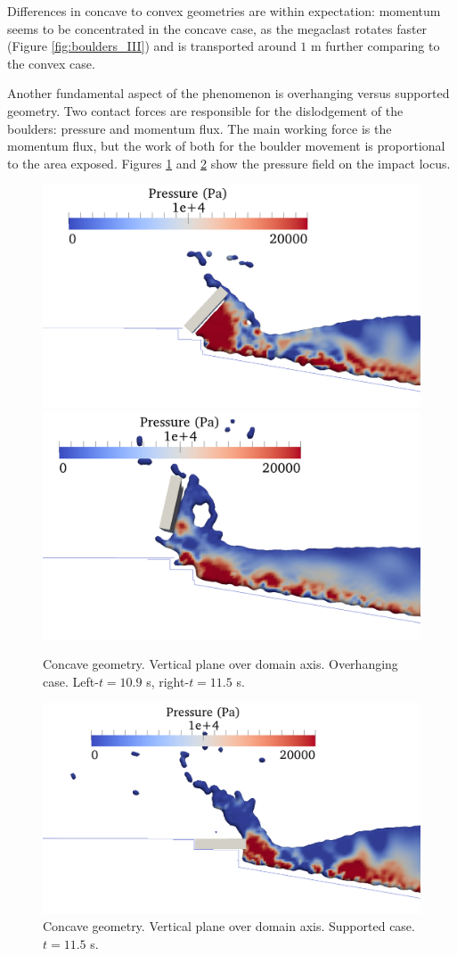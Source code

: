 Differences in concave to convex geometries are within expectation: momentum seems to be concentrated in the concave case, as the megaclast rotates faster (Figure \ref{fig:boulders_III}) and is transported around $1$ m further comparing to the convex case. 

Another fundamental aspect of the phenomenon is overhanging versus supported geometry. Two contact forces are responsible for the dislodgement of the boulders: pressure and momentum flux. The main working force is the momentum flux, but the work of both for the boulder movement is proportional to the area exposed. Figures \ref{fig:boulders_V} and \ref{fig:boulders_VI} show the pressure field on the impact locus. 

%
\begin{figure}[ht!]
	\centering
	\includegraphics[width=0.48\linewidth]{Figures/6.Chapter/2D_press_norm_I} 
	\includegraphics[width=0.48\linewidth]{Figures/6.Chapter/2D_press_norm_II}
	\caption{Concave geometry. Vertical plane over domain axis. Overhanging case. Left-$t=10.9$ s, right-$t=11.5$ s.}
	\label{fig:boulders_V} 
\end{figure}
%

%
\begin{figure}[ht!]
	\centering
	\includegraphics[width=0.48\linewidth]{Figures/6.Chapter/2D_press_flat}
	\caption{Concave geometry. Vertical plane over domain axis. Supported case. $t=11.5$ s.}
	\label{fig:boulders_VI} 
\end{figure}
%

